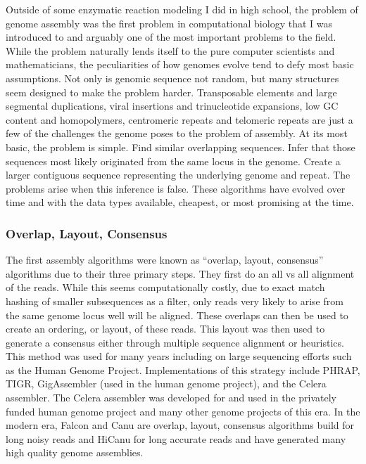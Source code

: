 \par{
Outside of some enzymatic reaction modeling I did in high school, the problem of genome assembly was the first problem in computational biology that I was introduced to and arguably one of the most important problems to the field. While the problem naturally lends itself to the pure computer scientists and mathematicians, the peculiarities of how genomes evolve tend to defy most basic assumptions. Not only is genomic sequence not random, but many structures seem designed to make the problem harder. Transposable elements and large segmental duplications, viral insertions and trinucleotide expansions, low GC content and homopolymers, centromeric repeats and telomeric repeats are just a few of the challenges the genome poses to the problem of assembly. At its most basic, the problem is simple. Find similar overlapping sequences. Infer that those sequences most likely originated from the same locus in the genome. Create a larger contiguous sequence representing the underlying genome and repeat. The problems arise when this inference is false. These algorithms have evolved over time and with the data types available, cheapest, or most promising at the time.
}
\subsubsection{Overlap, Layout, Consensus}

\par{
The first assembly algorithms were known as ``overlap, layout, consensus'' algorithms due to their three primary steps. They first do an all vs all alignment of the reads. While this seems computationally costly, due to exact match hashing of smaller subsequences as a filter, only reads very likely to arise from the same genome locus well will be aligned\cite{OLC}. These overlaps can then be used to create an ordering, or layout, of these reads. This layout was then used to generate a consensus either through multiple sequence alignment or heuristics\cite{gene1}. This method was used for many years including on large sequencing efforts such as the Human Genome Project\cite{genomeproject}. Implementations of this strategy include PHRAP\cite{phrap}, TIGR\cite{tigr}, GigAssembler\cite{gigassembler} (used in the human genome project), and the Celera assembler\cite{Myers2000}. The Celera assembler was developed for and used in the privately funded human genome project\cite{privategenome} and many other genome projects of this era. In the modern era, Falcon and Canu are overlap, layout, consensus algorithms build for long noisy reads\cite{falcon}\cite{canu} and HiCanu for long accurate reads\cite{HiCanu} and have generated many high quality genome assemblies\cite{singlemosquito}.
}

